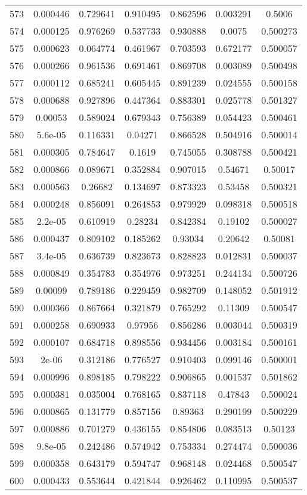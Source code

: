 \begin{table}
\begin{tabular}{c|c|c|c|c|c|c}
573 & 0.000446 & 0.729641 & 0.910495 & 0.862596 & 0.003291 & 0.5006\\
574 & 0.000125 & 0.976269 & 0.537733 & 0.930888 & 0.0075 & 0.500273\\
575 & 0.000623 & 0.064774 & 0.461967 & 0.703593 & 0.672177 & 0.500057\\
576 & 0.000266 & 0.961536 & 0.691461 & 0.869708 & 0.003089 & 0.500498\\
577 & 0.000112 & 0.685241 & 0.605445 & 0.891239 & 0.024555 & 0.500158\\
578 & 0.000688 & 0.927896 & 0.447364 & 0.883301 & 0.025778 & 0.501327\\
579 & 0.00053 & 0.589024 & 0.679343 & 0.756389 & 0.054423 & 0.500461\\
580 & 5.6e-05 & 0.116331 & 0.04271 & 0.866528 & 0.504916 & 0.500014\\
581 & 0.000305 & 0.784647 & 0.1619 & 0.745055 & 0.308788 & 0.500421\\
582 & 0.000866 & 0.089671 & 0.352884 & 0.907015 & 0.54671 & 0.50017\\
583 & 0.000563 & 0.26682 & 0.134697 & 0.873323 & 0.53458 & 0.500321\\
584 & 0.000248 & 0.856091 & 0.264853 & 0.979929 & 0.098318 & 0.500518\\
585 & 2.2e-05 & 0.610919 & 0.28234 & 0.842384 & 0.19102 & 0.500027\\
586 & 0.000437 & 0.809102 & 0.185262 & 0.93034 & 0.20642 & 0.50081\\
587 & 3.4e-05 & 0.636739 & 0.823673 & 0.828823 & 0.012831 & 0.500037\\
588 & 0.000849 & 0.354783 & 0.354976 & 0.973251 & 0.244134 & 0.500726\\
589 & 0.00099 & 0.789186 & 0.229459 & 0.982709 & 0.148052 & 0.501912\\
590 & 0.000366 & 0.867664 & 0.321879 & 0.765292 & 0.11309 & 0.500547\\
591 & 0.000258 & 0.690933 & 0.97956 & 0.856286 & 0.003044 & 0.500319\\
592 & 0.000107 & 0.684718 & 0.898556 & 0.934456 & 0.003184 & 0.500161\\
593 & 2e-06 & 0.312186 & 0.776527 & 0.910403 & 0.099146 & 0.500001\\
594 & 0.000996 & 0.898185 & 0.798222 & 0.906865 & 0.001537 & 0.501862\\
595 & 0.000381 & 0.035004 & 0.768165 & 0.837118 & 0.47843 & 0.500024\\
596 & 0.000865 & 0.131779 & 0.857156 & 0.89363 & 0.290199 & 0.500229\\
597 & 0.000886 & 0.701279 & 0.436155 & 0.854806 & 0.083513 & 0.50123\\
598 & 9.8e-05 & 0.242486 & 0.574942 & 0.753334 & 0.274474 & 0.500036\\
599 & 0.000358 & 0.643179 & 0.594747 & 0.968148 & 0.024468 & 0.500547\\
600 & 0.000433 & 0.553644 & 0.421844 & 0.926462 & 0.110995 & 0.500537\\
\end{tabular}
\end{table}
